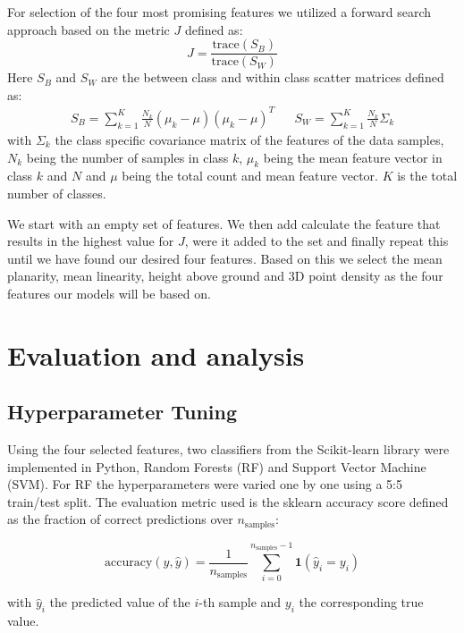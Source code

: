 \documentclass[a4paper,11pt]{scrartcl}
\begin{document}
For selection of the four most promising features we utilized a forward search approach based on the metric $J$ defined as:
\[
J = \frac{\mathrm{trace}(S_B)}{\mathrm{trace}(S_W)}
\]
Here $S_B$ and $S_W$ are the between class and within class scatter matrices defined as:
\begin{align*}
    S_B=\sum_{k=1}^K\frac{N_k}{N}(\mu_k-\mu)(\mu_k-\mu)^T && S_W=\sum_{k=1}^{K}\frac{N_k}{N}\Sigma_k
\end{align*}
with $\Sigma_k$ the class specific covariance matrix of the features of the data samples, $N_k$ being the number of samples in class $k$, $\mu_k$ being the mean feature vector in class $k$ and $N$ and $\mu$ being the total count and mean feature vector. $K$ is the total number of classes.

We start with an empty set of features. We then add calculate the feature that results in the highest value for $J$, were it added to the set and finally repeat this until we have found our desired four features. Based on this we select the mean planarity, mean linearity, height above ground and 3D point density as the four features our models will be based on.
 
\section{Evaluation and analysis}
\subsection{Hyperparameter Tuning}


Using the four selected features, two classifiers from the Scikit-learn library were implemented in Python, Random Forests (RF) and Support Vector Machine (SVM). For RF the hyperparameters were varied one by one using a 5:5 train/test split. The evaluation metric used is the sklearn accuracy score defined as the fraction of correct predictions over $n_{\text{samples}}$:

\begin{equation}
\mathrm{accuracy}(y, \hat{y}) = \frac{1}{n_{\text{samples}}} \sum_{i=0}^{n_{\text{samples}} - 1} \mathbf{1}(\hat{y}_i = y_i)
\end{equation}

with $\hat{y}_i$ the predicted value of the $i$-th sample and $y_i$ the corresponding true value.
\end{document}
